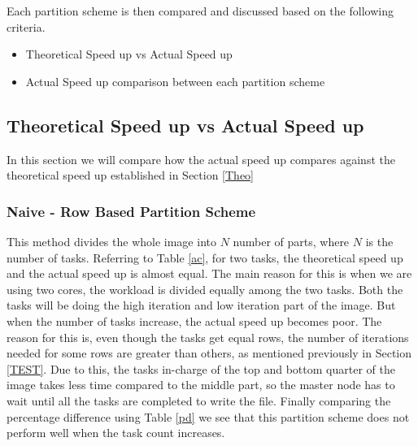 \documentclass[conference]{IEEEtran}
\begin{document}
	Each partition scheme is then compared and discussed based on the following criteria. 
	
	\begin{itemize}
		\item Theoretical Speed up vs Actual Speed up
		\item Actual Speed up comparison between each partition scheme
	\end{itemize}

	\subsection{Theoretical Speed up vs Actual Speed up}
	
	In this section we will compare how the actual speed up compares against the theoretical speed up established in Section \ref{Theo}
	
	\subsubsection{Naive - Row Based Partition Scheme }
	\label{naiveres}
	This method divides the whole image into $N$ number of parts, where $N$ is the number of tasks.
	Referring to Table \ref{ac}, for two tasks, the theoretical speed up and the actual speed up is almost equal. The main reason for this is when we are using two cores, the workload is divided equally among the two tasks. Both the tasks will be doing the high iteration and low iteration part of the image.
	But when the number of tasks increase, the actual speed up becomes poor. The reason for this is, even though the tasks get equal rows, the number of iterations needed for some rows are greater than others, as mentioned previously in Section \ref{TEST}. Due to this, the tasks in-charge of the top and bottom quarter of the image takes less time compared to the middle part, so the master node has to wait until all the tasks are completed to write the file. Finally comparing the percentage difference using Table \ref{pd} we see that this partition scheme does not perform well when the task count increases.
	
\end{document}

